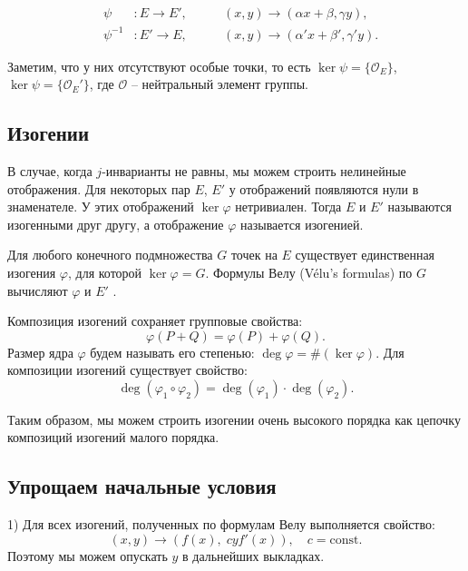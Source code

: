 \begin{equation*}
	\begin{aligned}
		& \psi      &: E \rightarrow E', \qquad & (x, y) \rightarrow (\alpha x + \beta, \gamma y), \\
		& \psi^{-1} &: E' \rightarrow E, \qquad & (x, y) \rightarrow (\alpha' x + \beta', \gamma' y).
	\end{aligned}
\end{equation*}

Заметим, что у них отсутствуют особые точки, то есть $\ker \psi = \{ \mathcal{O}_E \}$, $\ker \psi = \{ \mathcal{O}_E' \}$, где $\mathcal{O}$ -- нейтральный элемент группы.

\subsection{Изогении}

В случае, когда $j$-инварианты не равны, мы можем строить нелинейные отображения. Для некоторых пар $E$, $E'$ у отображений появляются нули в знаменателе. У этих отображений $\ker \varphi$ нетривиален. Тогда $E$ и $E'$ называются изогенными друг другу, а отображение $\varphi$ называется изогенией.

Для любого конечного подмножества $G$ точек на $E$ существует единственная изогения $\varphi$, для которой $\ker \varphi = G$. Формулы Велу (Vélu's formulas) по $G$ вычисляют $\varphi$ и $E'$ \cite{velu_elliptic}.

Композиция изогений сохраняет групповые свойства:
\begin{equation*}
	\varphi(P + Q) = \varphi(P) + \varphi(Q).
\end{equation*}
Размер ядра $\varphi$ будем называть его степенью: $\deg \varphi = \# (\ker \varphi)$. Для композиции изогений существует свойство:
\begin{equation*}
	\deg (\varphi_1 \circ \varphi_2) = \deg(\varphi_1) \cdot \deg(\varphi_2).
\end{equation*}

Таким образом, мы можем строить изогении очень высокого порядка как цепочку композиций изогений малого порядка.

\subsection{Упрощаем начальные условия}

1) Для всех изогений, полученных по формулам Велу выполняется свойство:
\begin{equation*}
	(x, y) \rightarrow (f(x),\; cyf'(x)), \quad c = \text{const}.
\end{equation*}
Поэтому мы можем опускать $y$ в дальнейших выкладках.

